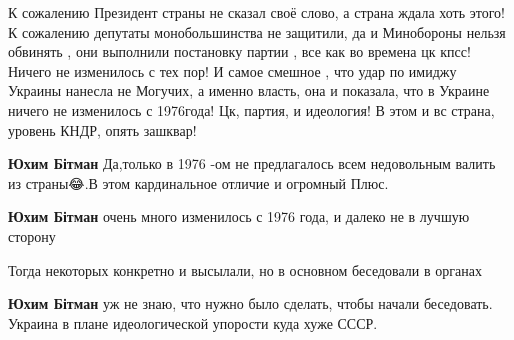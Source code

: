 \begin{itemize}
 
К сожалению Президент страны не сказал своё слово, а страна ждала хоть этого!
К сожалению депутаты монобольшинства не защитили, да и Минобороны нельзя
обвинять , они выполнили постановку партии , все как во времена цк кпсс! Ничего
не изменилось с тех пор! И самое смешное , что удар по имиджу Украины нанесла
не Могучих, а именно власть, она и показала, что в Украине ничего не изменилось
с 1976года! Цк, партия, и идеология! В этом и вс страна, уровень КНДР, опять
зашквар!

\begin{itemize}
 
\textbf{Юхим Бітман} Да,только в 1976 -ом не предлагалось всем недовольным валить из страны😂.В этом кардинальное отличие и огромный Плюс.🧐

 
\textbf{Юхим Бітман} очень много изменилось с 1976 года, и далеко не в лучшую сторону

 
Тогда некоторых конкретно и высылали, но в основном беседовали в органах

 
\textbf{Юхим Бітман} уж не знаю, что нужно было сделать, чтобы начали беседовать. Украина в плане идеологической упорости куда хуже СССР.


\end{itemize}
\end{itemize}
